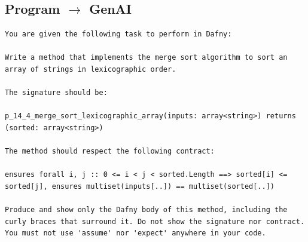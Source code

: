 \documentclass{article}
\begin{document}
\subsection*{Program $\rightarrow$ GenAI}
\begin{lstlisting}
You are given the following task to perform in Dafny:

Write a method that implements the merge sort algorithm to sort an array of strings in lexicographic order.

The signature should be:

p_14_4_merge_sort_lexicographic_array(inputs: array<string>) returns (sorted: array<string>)

The method should respect the following contract:

ensures forall i, j :: 0 <= i < j < sorted.Length ==> sorted[i] <= sorted[j], ensures multiset(inputs[..]) == multiset(sorted[..])

Produce and show only the Dafny body of this method, including the curly braces that surround it. Do not show the signature nor contract. You must not use 'assume' nor 'expect' anywhere in your code.
\end{lstlisting}
\end{document}
